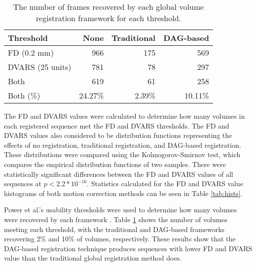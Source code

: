 \begin{table}[th]
\centering
\caption{The number of frames recovered by each global volume registration framework for each threshold.}
\label{tab:thresholds}
\begin{tabular}{|l|r|r|r|}
\hline
\textbf{Threshold} & \textbf{None} & \textbf{Traditional} & \textbf{DAG-based} \\ \hline
FD (0.2 mm)        & 966           & 175                  & 569                \\ \hline
DVARS (25 units)   & 781           & 78                   & 297                \\ \hline
Both               & 619           & 61                   & 258                \\ \hline
Both (\%)          & 24.27\%       & 2.39\%               & 10.11\%            \\ \hline
\end{tabular}
\end{table}


The FD and DVARS values were calculated to determine how many volumes in each registered sequence met the FD and DVARS thresholds. The FD and DVARS values also considered to be distribution functions representing the effects of no registration, traditional registration, and DAG-based registration. These distributions were compared using the Kolmogorov-Smirnov test, which compares the empirical distribution functions of two samples. There were statistically significant differences between the FD and DVARS values of all sequences at $p < 2.2*10^{-16}$. Statistics calculated for the FD and DVARS value histograms of both motion correction methods can be seen in Table \ref{tab:hists}.

Power et al.'s usability thresholds were used to determine how many volumes were recovered by each framework \cite{Power2014}. Table \ref{tab:thresholds} shows the number of volumes meeting each threshold, with the traditional and DAG-based frameworks recovering 2\% and 10\% of volumes, respectively. These results show that the DAG-based registration technique produces sequences with lower FD and DVARS value than the traditional global registration method does.
